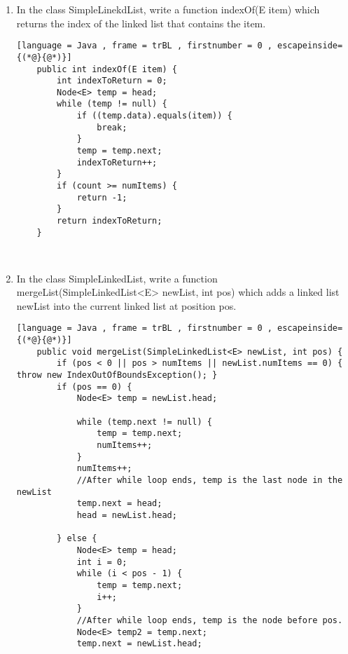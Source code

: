 \documentclass[letter]{article}
\begin{document}
\begin{enumerate}[1.]
    \begin{lstlisting}[language = Java , frame = trBL , firstnumber = 0 , escapeinside={(*@}{@*)}]
    public static void replace(ArrayList<String> aList, String oldItem,
    String newItem) {
        for (int i = 0; i < aList.size(); i++) {
            if (aList.get(i).equals(oldItem)) {
                aList.set(i, newItem);
            }
        }
        return aList;
    }
    \end{lstlisting}

    \newpage

    \item In the class SimpleLinekdList, write a function indexOf(E item) which returns the index of the linked list that contains the item.

    \begin{lstlisting}[language = Java , frame = trBL , firstnumber = 0 , escapeinside={(*@}{@*)}]
    public int indexOf(E item) {
        int indexToReturn = 0;
        Node<E> temp = head;
        while (temp != null) {
            if ((temp.data).equals(item)) {
                break;
            }
            temp = temp.next;
            indexToReturn++;
        }
        if (count >= numItems) {
            return -1;
        }
        return indexToReturn;
    }
    
    
    \end{lstlisting}

    
    \item In the class SimpleLinkedList, write a function mergeList(SimpleLinkedList<E> newList, int pos) which adds a linked list newList into the current linked list at position pos. 

    \begin{lstlisting}[language = Java , frame = trBL , firstnumber = 0 , escapeinside={(*@}{@*)}]
    public void mergeList(SimpleLinkedList<E> newList, int pos) {
        if (pos < 0 || pos > numItems || newList.numItems == 0) { throw new IndexOutOfBoundsException(); }
        if (pos == 0) {
            Node<E> temp = newList.head;
            
            while (temp.next != null) {
                temp = temp.next;
                numItems++;
            }
            numItems++;
            //After while loop ends, temp is the last node in the newList
            temp.next = head;
            head = newList.head;

        } else {
            Node<E> temp = head;
            int i = 0;
            while (i < pos - 1) {
                temp = temp.next;
                i++;
            }
            //After while loop ends, temp is the node before pos.
            Node<E> temp2 = temp.next; 
            temp.next = newList.head;
            

\end{lstlisting}
\end{enumerate}
\end{document}

